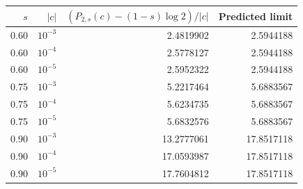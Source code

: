 \begin{tabular}{@{}rrr r@{}}
\toprule
$s$ & $|c|$ & $(P_{2,s}(c)-(1-s)\log2)/|c|$ & Predicted limit\\
\midrule
0.60 & $10^{-3}$ & 2.4819902 & 2.5944188\\
0.60 & $10^{-4}$ & 2.5778127 & 2.5944188\\
0.60 & $10^{-5}$ & 2.5952322 & 2.5944188\\
0.75 & $10^{-3}$ & 5.2217464 & 5.6883567\\
0.75 & $10^{-4}$ & 5.6234735 & 5.6883567\\
0.75 & $10^{-5}$ & 5.6832576 & 5.6883567\\
0.90 & $10^{-3}$ & 13.2777061 & 17.8517118\\
0.90 & $10^{-4}$ & 17.0593987 & 17.8517118\\
0.90 & $10^{-5}$ & 17.7604812 & 17.8517118\\
\bottomrule
\end{tabular}
